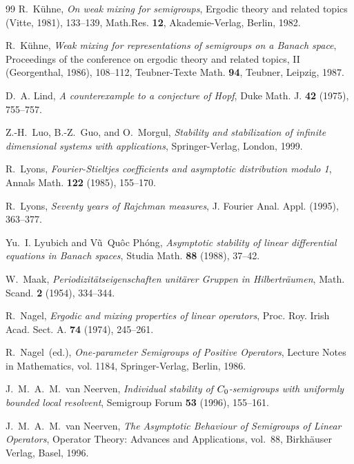 \documentclass[11pt,intlimits, draft,oneside]{amsart}
\theoremstyle{definition}
\begin{document}
\begin{thebibliography}{99}
R.~K\"uhne, %
\textit{On weak mixing for semigroups}, %
Ergodic theory and related topics (Vitte, 1981), 133--139, Math.Res. \textbf{12}, Akademie-Verlag, Berlin, 1982. %


R.~K\"uhne, %
\textit{Weak mixing for representations of semigroups on a Banach space}, %
Proceedings of the conference on ergodic theory and related topics, %
II (Georgenthal, 1986), 108--112, Teubner-Texte Math. \textbf{94}, Teubner, Leipzig, 1987. %


D.~A. Lind, %
\textit{A counterexample to a conjecture of {H}opf}, %
Duke Math. J. \textbf{42} (1975), 755--757. %


Z.-H.~Luo, B.-Z.~Guo, and O.~Morgul, %
\textit{Stability and stabilization of infinite dimensional systems with applications}, %
Springer-Verlag, London, 1999. %


R.~Lyons, %
\textit{{F}ourier-{S}tieltjes coefficients and asymptotic distribution modulo 1}, %
Annals Math. \textbf{122} (1985), 155--170. %


R.~Lyons, %
\textit{Seventy years of {R}ajchman measures}, %
J. Fourier Anal. Appl. (1995), 363--377. %


Yu.~I. Lyubich and V{\~u}~Qu\^{o}c Ph\'{o}ng, %
\textit{Asymptotic stability of linear differential equations in {B}anach spaces}, %
Studia Math. \textbf{88} (1988), 37--42. %


W.~Maak, %
\textit{Periodizit\"atseigenschaften unit\"arer {G}ruppen in {H}ilbertr\"aumen}, %
Math. Scand. \textbf{2} (1954), 334--344. %


R.~Nagel, %
\textit{Ergodic and mixing properties of linear operators}, %
Proc. Roy. Irish Acad. Sect. A. \textbf{74} (1974), 245--261. %


R.~Nagel~(ed.), %
\textit{One-parameter {S}emigroups of {P}ositive {O}perators}, %
Lecture Notes in Mathematics, vol. 1184, Springer-Verlag, Berlin, 1986. %


J.~M.~A.~M.~van Neerven, %
\textit{Individual stability of {$C\sb 0$}-semigroups with uniformly bounded local resolvent}, %
Semigroup Forum \textbf{53} (1996), 155--161. %


J.~M.~A.~M.~van Neerven, %
\textit{The {A}symptotic {B}ehaviour of {S}emigroups of {L}inear {O}perators}, %
Operator Theory: Advances and Applications, vol.~88, Birkh\"{a}user Verlag, Basel, 1996. %



\end{thebibliography}
\end{document}
